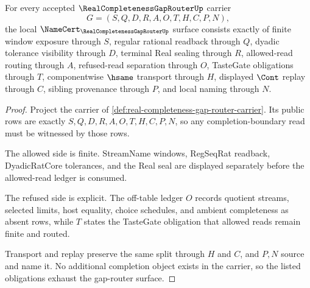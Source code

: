 \begin{theorem}
\label{thm:real-completeness-gap-router-namecert-obligations}
For every accepted $\RealCompletenessGapRouterUp$ carrier
$$
G=(S,Q,D,R,A,O,T,H,C,P,N),
$$
the local $\NameCert_{\RealCompletenessGapRouterUp}$ surface consists exactly of finite window exposure through $S$, regular rational readback through $Q$, dyadic tolerance visibility through $D$, terminal Real sealing through $R$, allowed-read routing through $A$, refused-read separation through $O$, TasteGate obligations through $T$, componentwise $\hsame$ transport through $H$, displayed $\Cont$ replay through $C$, sibling provenance through $P$, and local naming through $N$.
\end{theorem}
\begin{proof}
Project the carrier of \autoref{def:real-completeness-gap-router-carrier}. Its public rows are exactly $S,Q,D,R,A,O,T,H,C,P,N$, so any completion-boundary read must be witnessed by those rows.

The allowed side is finite. StreamName windows, RegSeqRat readback, DyadicRatCore tolerances, and the Real seal are displayed separately before the allowed-read ledger is consumed.

The refused side is explicit. The off-table ledger $O$ records quotient streams, selected limits, host equality, choice schedules, and ambient completeness as absent rows, while $T$ states the TasteGate obligation that allowed reads remain finite and routed.

Transport and replay preserve the same split through $H$ and $C$, and $P,N$ source and name it. No additional completion object exists in the carrier, so the listed obligations exhaust the gap-router surface.
\end{proof}


